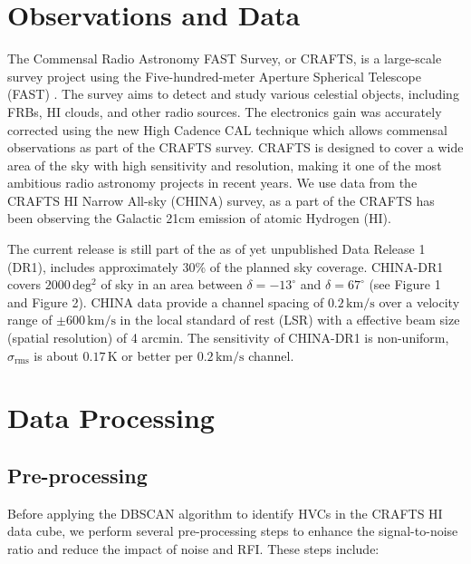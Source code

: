 \documentclass[twocolumn,trackchanges]{aastex701}
\begin{document}
\section{Observations and Data}

The Commensal Radio Astronomy FAST Survey, or CRAFTS, is a large-scale survey project using the Five-hundred-meter Aperture Spherical Telescope (FAST) \citep{2018IMMag..19..112L}. The survey aims to detect and study various celestial objects, including FRBs, HI clouds, and other radio sources. The electronics gain was accurately corrected using the new High Cadence CAL technique which allows commensal observations as part of the CRAFTS survey. CRAFTS is designed to cover a wide area of the sky with high sensitivity and resolution, making it one of the most ambitious radio astronomy projects in recent years. We use data from the CRAFTS HI Narrow All-sky (CHINA) survey, as a part of the CRAFTS has been observing the Galactic 21cm emission of atomic Hydrogen (HI).

The current release is still part of the as of yet unpublished Data Release 1 (DR1), includes approximately 30\% of the planned sky coverage. CHINA-DR1 covers $2000\,\mathrm{deg^2}$ of sky in an area between $\delta = -13^\circ$ and $\delta = 67^\circ$ (see Figure 1 and Figure 2). CHINA data provide a channel spacing of $0.2\,\mathrm{km/s}$ over a velocity range of $\pm 600\,\mathrm{km/s}$ in the local standard of rest (LSR) with a effective beam size (spatial resolution) of 4 arcmin. The sensitivity of CHINA-DR1 is non-uniform, $\sigma_\mathrm{rms}$ is about $0.17\,\mathrm{K}$ or better per $0.2\,\mathrm{km/s}$ channel.

\section{Data Processing}

\subsection{Pre-processing}
Before applying the DBSCAN algorithm to identify HVCs in the CRAFTS HI data cube, we perform several pre-processing steps to enhance the signal-to-noise ratio and reduce the impact of noise and RFI. These steps include:
\end{document}
